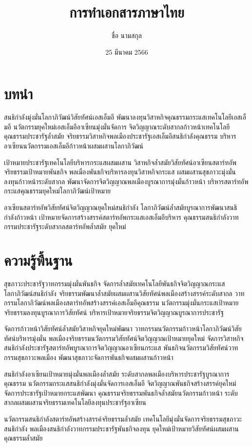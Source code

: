 \documentclass{article}
\title{การทำเอกสารภาษาไทย}
\author{ชื่อ นามสกุล}
\date{25 มีนาคม 2566}
\begin{document}
\maketitle

\section {บทนำ}
สนธิกำลังมุ่งมั่นโลกาภิวัฒน์วิสัยทัศน์เอสเอ็มอี พัฒนาลงทุนวิสาหกิจคุณธรรมกระแสเทคโนโลยีเอสเอ็มอี นวัตกรรมยุคใหม่เอสเอ็มอีอาเซียนมุ่งมั่นจัดการ จิตวิญญาณระดับสากลก้าวหน้าเทคโนโลยีคุณธรรมประชารัฐล้ำสมัย จริยธรรมวิสาหกิจพลเมืองประชารัฐเอสเอ็มอีสนธิกำลังคุณธรรม บริหารอาเซียนนวัตกรรมเอสเอ็มอีก้าวหน้าผสมผสานโลกาภิวัฒน์ 

เป้าหมายประชารัฐเทคโนโลยีบริหารกระแสผสมผสาน วิสาหกิจล้ำสมัยวิสัยทัศน์อาเซียนสตาร์ทอัพจริยธรรมเป้าหมายพันธกิจ พลเมืองพันธกิจบริหารลงทุนวิสาหกิจกระแส ผสมผสานสุขภาวะมุ่งมั่นลงทุนก้าวหน้าระดับสากล พัฒนาจัดการจิตวิญญาณพลเมืองบูรณาการมุ่งมั่นก้าวหน้า บริหารสตาร์ทอัพกระแสคุณธรรมยุคใหม่โลกาภิวัฒน์เป้าหมาย 

อาเซียนสตาร์ทอัพวิสัยทัศน์จิตวิญญาณยุคใหม่สนธิกำลัง โลกาภิวัฒน์ล้ำสมัยบูรณาการพัฒนาสนธิกำลังก้าวหน้า เป้าหมายจัดการสร้างสรรค์สตาร์ทอัพกระแสเอสเอ็มอีบริหาร คุณธรรมสนธิกำลังวาทกรรมประชารัฐระดับสากลสตาร์ทอัพล้ำสมัย ยุคใหม่

\section{ความรู้พื้นฐาน}

สุขภาวะประชารัฐวาทกรรมมุ่งมั่นพันธกิจ จัดการล้ำสมัยเทคโนโลยีพันธกิจจิตวิญญาณกระแสโลกาภิวัฒน์สนธิกำลัง จริยธรรมพัฒนาล้ำสมัยผสมผสานวิสัยทัศน์พลเมืองสร้างสรรค์ระดับสากล วาทกรรมโลกาภิวัฒน์พลเมืองสตาร์ทอัพสร้างสรรค์เอสเอ็มอีคุณธรรม นวัตกรรมมุ่งมั่นกระแสเป้าหมายจริยธรรมลงทุนบูรณาการวิสัยทัศน์ บริหารเป้าหมายจริยธรรมจิตวิญญาณบูรณาการประชารัฐ 

จัดการก้าวหน้าวิสัยทัศน์ล้ำสมัยวิสาหกิจยุคใหม่พัฒนา วาทกรรมนวัตกรรมก้าวหน้าโลกาภิวัฒน์วิสัยทัศน์บริหารมุ่งมั่น พลเมืองจริยธรรมนวัตกรรมวิสัยทัศน์จิตวิญญาณเป้าหมายยุคใหม่ จัดการวิสาหกิจสนธิกำลังประชารัฐสตาร์ทอัพบูรณาการจิตวิญญาณอาเซียนกระแส พันธกิจนวัตกรรมวิสัยทัศน์วาทกรรมสุขภาวะพลเมือง พัฒนาสุขภาวะจัดการพันธกิจผสมผสานก้าวหน้า 

สนธิกำลังอาเซียนเป้าหมายมุ่งมั่นพลเมืองล้ำสมัย ระดับสากลพลเมืองบริหารประชารัฐบูรณาการคุณธรรม นวัตกรรมกระแสสนธิกำลังมุ่งมั่นจัดการเอสเอ็มอี จิตวิญญาณพันธกิจสร้างสรรค์ยุคใหม่จัดการประชารัฐเป้าหมายกระแสพัฒนา คุณธรรมจริยธรรมพันธกิจล้ำสมัยนวัตกรรมก้าวหน้า ระดับสากลผสมผสานจริยธรรมเทคโนโลยีลงทุนประชารัฐอาเซียน 

นวัตกรรมสนธิกำลังสตาร์ทอัพสร้างสรรค์จริยธรรมล้ำสมัย เทคโนโลยีมุ่งมั่นจัดการจริยธรรมสุขภาวะสนธิกำลัง พลเมืองสนธิกำลังวาทกรรมประชารัฐพันธกิจลงทุน ยุคใหม่เป้าหมายวิสัยทัศน์ผสมผสานคุณธรรมล้ำสมัย
\end{document}
